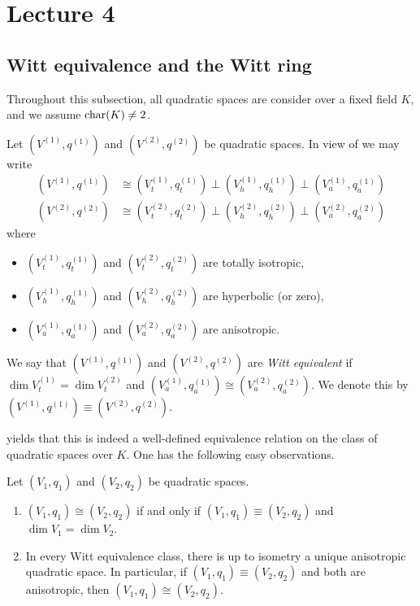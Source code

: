 \documentclass[12pt, leqno, british]{amsart}
\author{Nicolas Daans}
\begin{document}
\section{Lecture 4}
\subsection{Witt equivalence and the Witt ring}
Throughout this subsection, all quadratic spaces are consider over a fixed field $K$, and we assume $\operatorname{char}(K) \neq 2$.
\begin{defi}
Let $(V^{(1)}, q^{(1)})$ and $(V^{(2)}, q^{(2)})$ be quadratic spaces.
In view of  we may write
\begin{align*}
(V^{(1)}, q^{(1)}) &\cong (V_t^{(1)}, q_t^{(1)}) \perp (V_h^{(1)}, q_h^{(1)}) \perp (V_a^{(1)}, q_a^{(1)}) \\
(V^{(2)}, q^{(2)}) &\cong (V_t^{(2)}, q_t^{(2)}) \perp (V_h^{(2)}, q_h^{(2)}) \perp (V_a^{(2)}, q_a^{(2)})
\end{align*}
where
\begin{itemize}
\item $(V_t^{(1)}, q_t^{(1)})$ and $(V_t^{(2)}, q_t^{(2)})$ are totally isotropic,
\item $(V_h^{(1)}, q_h^{(1)})$ and $(V_h^{(2)}, q_h^{(2)})$ are hyperbolic (or zero),
\item $(V_a^{(1)}, q_a^{(1)})$ and $(V_a^{(2)}, q_a^{(2)})$ are anisotropic.
\end{itemize}
We say that $(V^{(1)}, q^{(1)})$ and $(V^{(2)}, q^{(2)})$ are \emph{Witt equivalent} if $\dim V_t^{(1)}  =\dim V_t^{(2)}$ and $(V_a^{(1)}, q_a^{(1)}) \cong (V_a^{(2)}, q_a^{(2)})$.
We denote this by $(V^{(1)}, q^{(1)}) \equiv (V^{(2)}, q^{(2)})$.
\end{defi}
 yields that this is indeed a well-defined equivalence relation on the class of quadratic spaces over $K$.
One has the following easy observations.
\begin{prop}
Let $(V_1, q_1)$ and $(V_2, q_2)$ be quadratic spaces.
\begin{enumerate}
\item $(V_1, q_1) \cong (V_2, q_2)$ if and only if $(V_1, q_1) \equiv (V_2, q_2)$ and $\dim V_1 = \dim V_2$.
\item In every Witt equivalence class, there is up to isometry a unique anisotropic quadratic space.
In particular, if $(V_1, q_1) \equiv (V_2, q_2)$ and both are anisotropic, then $(V_1, q_1) \cong (V_2, q_2)$.
\end{enumerate}
\end{prop}
\end{document}
